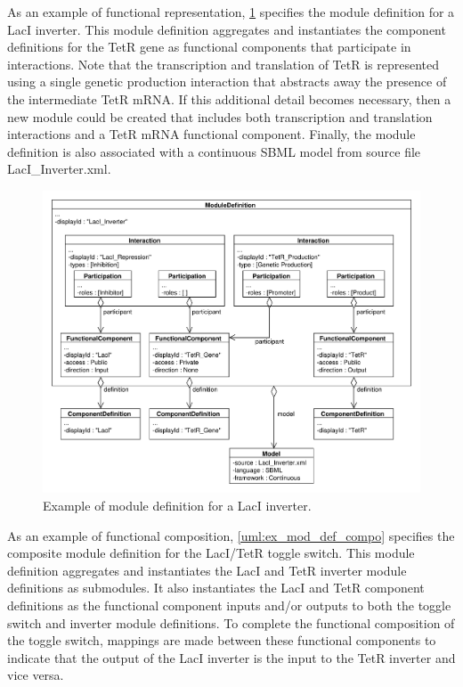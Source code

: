 As an example of functional representation, \ref{uml:ex_mod_def} specifies the module definition for a LacI inverter. This module definition aggregates and instantiates the component definitions for the TetR gene as functional components that participate in interactions. Note that the transcription and translation of TetR is represented using a single genetic production interaction that abstracts away the presence of the intermediate TetR mRNA. If this additional detail becomes necessary, then a new module could be created that includes both transcription and translation interactions and a TetR mRNA functional component. Finally, the module definition is also associated with a continuous SBML model from source file LacI\_Inverter.xml.

\begin{figure}[ht]
\begin{center}
\includegraphics[width=\textwidth]{example_uml/toggle_3}
\caption[]{Example of module definition for a LacI inverter.}
\label{uml:ex_mod_def}
\end{center}
\end{figure}

As an example of functional composition, \ref{uml:ex_mod_def_compo} specifies the composite module definition for the LacI/TetR toggle switch. This module definition aggregates and instantiates the LacI and TetR inverter module definitions as submodules. It also instantiates the LacI and TetR component definitions as the functional component inputs and/or outputs to both the toggle switch and inverter module definitions. To complete the functional composition of the toggle switch, mappings are made between these functional components to indicate that the output of the LacI inverter is the input to the TetR inverter and vice versa.

